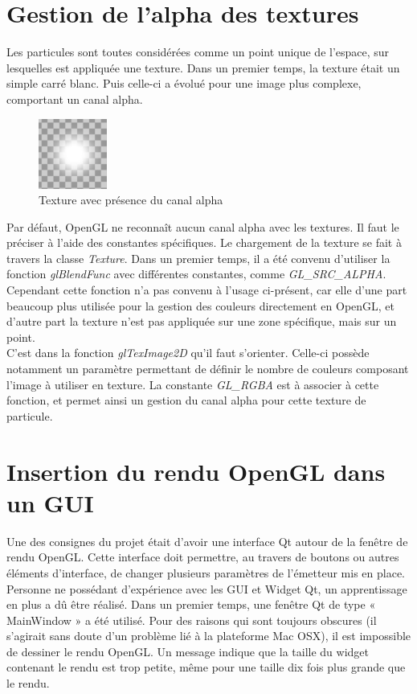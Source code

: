 \section{Gestion de l'alpha des textures}

Les particules sont toutes considérées comme un point unique de l'espace, sur
lesquelles est appliquée une texture. Dans un premier temps, la texture était un
simple carré blanc. Puis celle-ci a évolué pour une image plus complexe,
comportant un canal alpha.
\newpage

\begin{figure}[h]
	\begin{center}
		\includegraphics[width=0.2\textwidth]{img/33-texture.png}
	\end{center}
	\caption{Texture avec présence du canal alpha}
\end{figure}

Par défaut, OpenGL ne reconnaît aucun canal alpha avec les textures. Il faut le
préciser à l'aide des constantes spécifiques. Le chargement de la texture se
fait à travers la classe \emph{Texture}. Dans un premier temps, il a été convenu
d'utiliser la fonction \emph{glBlendFunc} avec différentes constantes, comme
\emph{GL\_SRC\_ALPHA}. Cependant cette fonction n'a pas convenu à l'usage ci-présent,
car elle d'une part beaucoup plus utilisée pour la gestion des couleurs
directement en OpenGL, et d'autre part la texture n'est pas appliquée sur une 
zone spécifique, mais sur un point.\\

C'est dans la fonction \emph{glTexImage2D} qu'il faut s'orienter. Celle-ci possède
notamment un paramètre permettant de définir le nombre de couleurs composant
l'image à utiliser en texture. La constante \emph{GL\_RGBA} est à associer à cette
fonction, et permet ainsi un gestion du canal alpha pour cette texture de
particule.

\section{Insertion du rendu OpenGL dans un GUI}\label{gui}

Une des consignes du projet était d'avoir une interface Qt autour de la fenêtre
de rendu OpenGL. Cette interface doit permettre, au travers de boutons ou autres
éléments d'interface, de changer plusieurs paramètres de l'émetteur mis en
place. Personne ne possédant d'expérience avec les GUI et Widget Qt, un
apprentissage en plus a dû être réalisé. Dans un premier temps, une fenêtre Qt 
de type « MainWindow » a été utilisé. Pour des raisons qui sont toujours
obscures (il s'agirait sans doute d'un problème lié à la plateforme Mac OSX), il
est impossible de dessiner le rendu OpenGL. Un message indique que la taille du
widget contenant le rendu est trop petite, même pour une taille dix fois plus
grande que le rendu.\\

